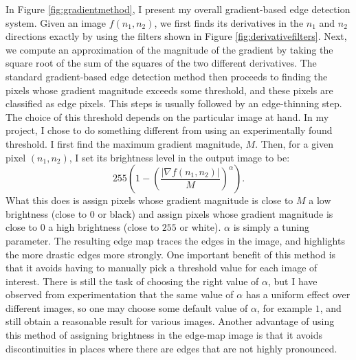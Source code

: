 \documentclass[12pt]{amsart}
\begin{document}
In Figure \ref{fig:gradientmethod}, I present my overall gradient-based edge detection system. Given an image $f(n_1, n_2)$, we first finds its derivatives in the $n_1$ and $n_2$ directions exactly by using the filters shown in Figure \ref{fig:derivativefilters}. Next, we compute an approximation of the magnitude of the gradient by taking the square root of the sum of the squares of the two different derivatives. The standard gradient-based edge detection method then proceeds to finding the pixels whose gradient magnitude exceeds some threshold, and these pixels are classified as edge pixels. This steps is usually followed by an edge-thinning step. The choice of this threshold depends on the particular image at hand. In my project, I chose to do something different from using an experimentally found threshold. I first find the maximum gradient magnitude, $M$. Then, for a given pixel $(n_1, n_2)$, I set its brightness level in the output image to be:
\begin{equation*}
255 \left(1 - \left(\frac{|\nabla f(n_1, n_2)|}{M}\right)^\alpha\right).
\end{equation*}
What this does is assign pixels whose gradient magnitude is close to $M$ a low brightness (close to $0$ or black) and assign pixels whose gradient magnitude is close to $0$ a high brightness (close to $255$ or white). $\alpha$ is simply a tuning parameter. The resulting edge map traces the edges in the image, and highlights the more drastic edges more strongly. One important benefit of this method is that it avoids having to manually pick a threshold value for each image of interest. There is still the task of choosing the right value of $\alpha$, but I have observed from experimentation that the same value of $\alpha$ has a uniform effect over different images, so one may choose some default value of $\alpha$, for example $1$, and still obtain a reasonable result for various images. Another advantage of using this method of assigning brightness in the edge-map image is that it avoids discontinuities in places where there are edges that are not highly pronounced.
\end{document}
